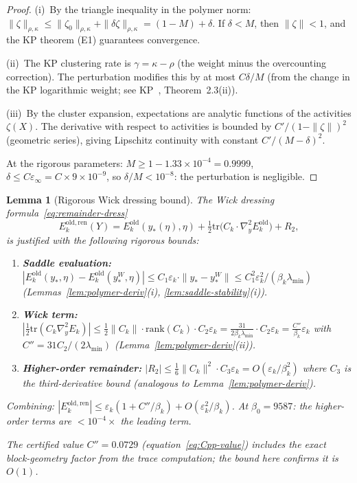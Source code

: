 \documentclass[11pt]{article}
\newtheorem{lemma}[theorem]{Lemma}
\theoremstyle{definition}
\begin{document}
\begin{proof}
(i)~By the triangle inequality in the polymer norm:
$\|\zeta\|_{\rho,\kappa}\le\|\zeta_0\|_{\rho,\kappa}
+\|\delta\zeta\|_{\rho,\kappa}=(1-M)+\delta$.
If $\delta<M$, then $\|\zeta\|<1$, and the KP theorem
(E1) guarantees convergence.

(ii)~The KP clustering rate is $\gamma=\kappa-\rho$
(the weight minus the overcounting correction).
The perturbation modifies this by at most
$C\delta/M$ (from the change in the KP logarithmic
weight; see KP~\cite{KP}, Theorem~2.3(ii)).

(iii)~By the cluster expansion, expectations are
analytic functions of the activities $\zeta(X)$.
The derivative with respect to activities is bounded
by $C'/(1-\|\zeta\|)^2$ (geometric series), giving
Lipschitz continuity with constant $C'/(M-\delta)^2$.

At the rigorous parameters:
$M\ge 1-1.33\times 10^{-4}=0.9999$,
$\delta\le C\varepsilon_\infty=C\times 9\times 10^{-9}$,
so $\delta/M<10^{-8}$: the perturbation is negligible.
\end{proof}

\begin{lemma}[Rigorous Wick dressing bound]%
\label{lem:wick-rigorous}
The Wick dressing formula~\eqref{eq:remainder-dress}
\[
E_k^{\mathrm{old,ren}}(Y)
=E_k^{\mathrm{old}}(y_*(\eta),\eta)
+\tfrac{1}{2}\mathrm{tr}\bigl(C_k\cdot\nabla_y^2 E_k^{\mathrm{old}}\bigr)
+R_2,
\]
is justified with the following rigorous bounds:
\begin{enumerate}[nosep,label=\textup{(\roman*)}]
\item \textbf{Saddle evaluation:}
$|E_k^{\mathrm{old}}(y_*,\eta)-E_k^{\mathrm{old}}(y_*^W,\eta)|
\le C_1\varepsilon_k\cdot\|y_*-y_*^W\|
\le C_1^2\varepsilon_k^2/(\beta_k\lambda_{\min})$
\textup{(}Lemmas~\ref{lem:polymer-deriv}(i),
\ref{lem:saddle-stability}(i)\textup{)}.
\item \textbf{Wick term:}
$|\frac{1}{2}\mathrm{tr}(C_k\nabla_y^2 E_k)|
\le\frac{1}{2}\|C_k\|\cdot\mathrm{rank}(C_k)
\cdot C_2\varepsilon_k
=\frac{31}{2\beta_k\lambda_{\min}}\cdot C_2\varepsilon_k
=\frac{C''}{\beta_k}\varepsilon_k$
with $C''=31 C_2/(2\lambda_{\min})$
\textup{(}Lemma~\ref{lem:polymer-deriv}(ii)\textup{)}.
\item \textbf{Higher-order remainder:}
$|R_2|\le\frac{1}{6}\|C_k\|^2\cdot C_3\varepsilon_k
=O(\varepsilon_k/\beta_k^2)$
where $C_3$ is the third-derivative bound
\textup{(}analogous to Lemma~\ref{lem:polymer-deriv}\textup{)}.
\end{enumerate}
Combining: $|E_k^{\mathrm{old,ren}}|
\le\varepsilon_k(1+C''/\beta_k)+O(\varepsilon_k^2/\beta_k)$.
At $\beta_0=9587$: the higher-order terms are
$<10^{-4}\times$ the leading term.

The certified value $C''=0.0729$
\textup{(}equation~\eqref{eq:Cpp-value}\textup{)} includes
the exact block-geometry factor from the trace
computation; the bound here confirms it is $O(1)$.
\end{lemma}
\end{document}

